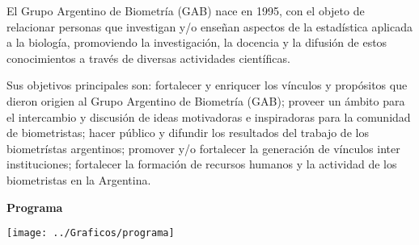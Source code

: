 El Grupo Argentino de Biometría (GAB) nace en 1995, con el objeto de relacionar personas que investigan y/o enseñan aspectos de la estadística aplicada a la biología, promoviendo la investigación, la docencia y la difusión de estos conocimientos a través de diversas actividades científicas.

Sus objetivos principales son: fortalecer y enriqucer los vínculos y propósitos que dieron origien al Grupo Argentino de Biometría (GAB); proveer un ámbito para el intercambio y discusión de ideas motivadoras e inspiradoras para la comunidad de biometristas; hacer público y difundir los resultados del trabajo de los biometrístas argentinos; promover y/o fortalecer la generación de vínculos inter instituciones; fortalecer la formación de recursos humanos y la actividad de los biometristas en la Argentina. 


\newpage
\pagestyle{fancy}
\setlength\parindent{16pt}

\vspace*{1cm}
\centerline{\textbf{\LARGE{Programa}}}

\begin{center} \setlength{\unitlength}{1cm}
  \texttt{[image: ../Graficos/programa]}
\end{center}
